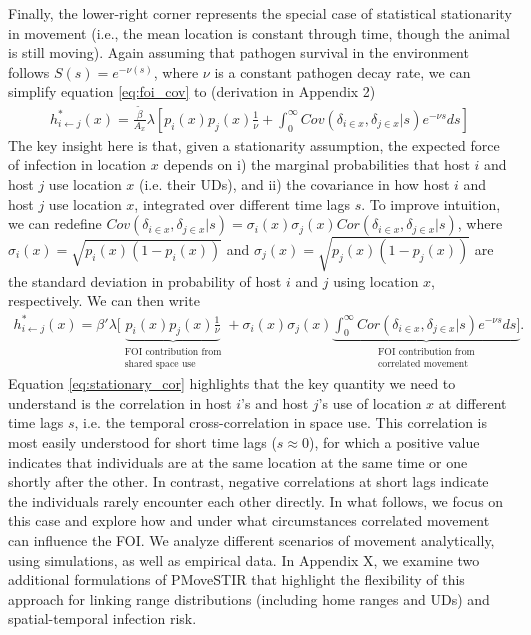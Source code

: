 \documentclass[letterpaper]{article}
\begin{document}
Finally, the lower-right corner represents the special case of statistical stationarity in movement (i.e., the mean location is constant through time, though the animal is still moving).
Again assuming that pathogen survival in the environment follows $S(s) = e^{-\nu (s)}$, where $\nu$ is a constant pathogen decay rate,  we can simplify equation \ref{eq:foi_cov} to (derivation in Appendix 2)
\begin{equation}
    \begin{aligned}
   h^*_{i \leftarrow j}(x) = \frac{\tilde{\beta}}{A_x} \lambda \left[p_i(x)p_j(x) \frac{1}{\nu} + \int_{0}^{\infty} Cov(\delta_{i \in x}, \delta_{j \in x} | s) e^{-\nu s} ds\right]
    \end{aligned}
    \label{eq:foi_stationary}
\end{equation}
The key insight here is that, given a stationarity assumption, the expected force of infection in location $x$ depends on i) the marginal probabilities that host $i$ and host $j$ use location $x$ (i.e. their UDs),  and ii) the covariance in how host $i$ and host $j$ use location $x$, integrated over different time lags $s$. 
To improve intuition, we can redefine $Cov(\delta_{i \in x}, \delta_{j \in x} | s) = \sigma_i(x) \sigma_j(x) Cor(\delta_{i \in x}, \delta_{j \in x} | s)$, where $\sigma_i(x) = \sqrt{p_i(x)(1 - p_i(x))}$  and $\sigma_j(x) = \sqrt{p_j(x)(1 - p_j(x))}$ are the standard deviation in probability of host $i$ and $j$ using location $x$, respectively.  We can then write
\begin{equation}
    \begin{aligned}
    h^*_{i \leftarrow j}(x) = \beta' \lambda [ \underbrace{p_i(x)p_j(x) \frac{1}{\nu}}_{\substack{\text{FOI contribution from} \\ \text{shared space use}}} + \sigma_i(x) \sigma_j(x) \underbrace{\int_{0}^{\infty} Cor(\delta_{i \in x}, \delta_{j \in x} | s) e^{-\nu s} ds]}_{\substack{\text{FOI contribution from} \\ \text{correlated movement}}}.
    \end{aligned}
    \label{eq:stationary_cor}
\end{equation}
Equation \ref{eq:stationary_cor} highlights that the key quantity we need to understand is the correlation in host $i$'s and host $j$'s use of location $x$ at different time lags $s$, i.e. the temporal cross-correlation in space use.
This correlation is most easily understood for short time lags ($s\approx0$), for which a positive value indicates that individuals are at the same location at the same time or one shortly after the other. In contrast, negative correlations at short lags indicate the individuals rarely encounter each other directly.
In what follows, we focus on this case and explore how and under what circumstances correlated movement can influence the FOI. We analyze different scenarios of movement analytically, using simulations, as well as empirical data.  In Appendix X, we examine two additional formulations of PMoveSTIR that highlight the flexibility of this approach for linking range distributions (including home ranges and UDs) and spatial-temporal infection risk.
\end{document}
